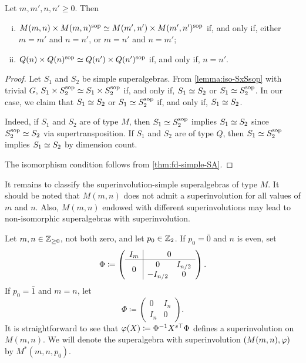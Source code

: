 \begin{prop}
    Let $m,m',n,n' \geq 0$. %
    Then 
    \begin{enumerate}[(i)]
        \item $M(m,n) \times M(m,n)^{\mathrm{sop}} \simeq M(m',n') \times M(m',n')^{\mathrm{sop}}$ if, and only if, either $m = m'$ and $n = n'$, or $m = n'$ and $n = m'$; 
        \item $Q(n) \times Q(n)^{\mathrm{sop}} \simeq Q(n') \times Q(n')^{\mathrm{sop}}$ if, and only if, $n = n'$.
    \end{enumerate}
\end{prop}

\begin{proof}
    Let $S_1$ and $S_2$ be simple superalgebras. 
    From \cref{lemma:iso-SxSsop} with trivial $G$, $S_1\times S_2^{\mathrm{sop}} \simeq S_1\times S_2^{\mathrm{sop}}$ if, and only if, $S_1 \simeq S_2$ or $S_1 \simeq S_2^{\mathrm{sop}}$. 
    In our case, we claim that  $S_1 \simeq S_2$ or $S_1 \simeq S_2^{\mathrm{sop}}$ if, and only if, $S_1 \simeq S_2$. 
    
    Indeed, if $S_1$ and $S_2$ are of type $M$, then $S_1 \simeq S_2^{\mathrm{sop}}$ implies $S_1 \simeq S_2$ since $S_2^{\mathrm{sop}} \simeq S_2$ via supertransposition. 
    If $S_1$ and $S_2$ are of type $Q$, then $S_1 \simeq S_2^{\mathrm{sop}}$ implies $S_1 \simeq S_2$ by dimension count. 
    
    The isomorphism condition follows from \cref{thm:fd-simple-SA}.
\end{proof}

It remains to classify the superinvolution-simple superalgebras of type $M$. 
It should be noted that $M(m,n)$ does not admit a superinvolution for all values of $m$ and $n$. 
Also, $M(m,n)$ endowed with different superinvolutions may lead to non-isomorphic superalgebras with superinvolution. 

\begin{defi}\label{defi:M(m-n-p_0)}
    Let $m,n \in \mathbb{Z}_{\geq 0}$, not both zero, and let $p_0 \in \mathbb{Z}_2$. 
    If $p_0 = \bar 0$ and $n$ is even, set 
    \[
        \sbox0{$\begin{matrix} 0& I_{n/2}\\ -I_{n/2}& 0\end{matrix}$}
        \Phi \coloneqq \left(\begin{array}{c|c}
                    I_m & 0\\
                    \hline
                    0 & \usebox{0}
                \end{array}\right).
    \]
    If $p_0 = \bar 1$ and $m = n$, let
    \[
        \Phi \coloneqq \left(\begin{array}{c|c}
                    0 & I_n\\
                    \hline 
                    I_n & 0
                \end{array}\right).
    \]
    It is straightforward to see that $\varphi(X) \coloneqq \Phi^{-1} X^{s\top} \Phi$ defines a superinvolution on $M(m,n)$. 
    We will denote the superalgebra with superinvolution $(M(m,n), \varphi)$ by $M^*(m,n, p_0)$. 
\end{defi}

